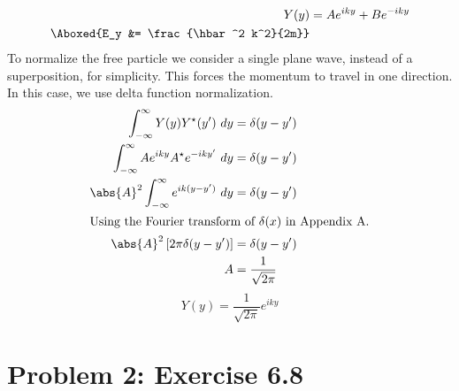 \documentclass{article}
\numberwithin{equation}{section}
\begin{document}
\begin{enumerate}
\begin{align}
            Y(y) &= Ae^{iky} + Be^{-iky} \\
             \Aboxed{E_y &= \frac{\hbar^2 k^2}{2m}}
        \end{align}
        To normalize the free particle we consider a single plane wave, instead of a superposition, for simplicity. This forces the momentum to travel in one direction. In this case, we use delta function normalization.
        \begin{align}
            \int_{-\infty}^{\infty} Y(y) Y^\star(y^\prime) \ dy &= \delta(y-y^\prime) \\
            \int_{-\infty}^{\infty} Ae^{iky} A^\star e^{-iky^\prime} \ dy &= \delta(y-y^\prime) \\
            \abs{A}^2 \int_{-\infty}^{\infty} e^{ik(y-y^\prime)} \ dy &= \delta(y-y^\prime) \\
            \intertext{Using the Fourier transform of $\delta(x)$ in Appendix A.}
            \abs{A}^2 \left[ 2\pi \delta(y-y^\prime) \right] &= \delta(y-y^\prime) \\
            A &= \frac{1}{\sqrt{2\pi}}
        \end{align}
        \begin{equation}
            \boxed{Y(y) = \frac{1}{\sqrt{2\pi}}e^{iky}}
        \end{equation}
        
	\end{enumerate}
	
\clearpage

	\section{Problem 2: Exercise 6.8}
	
\end{document}
